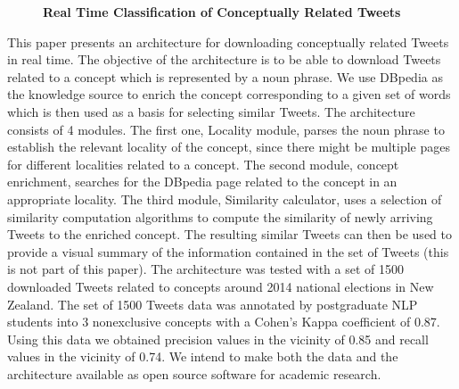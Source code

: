 \documentclass[10pt, a4paper, twopage, headinclude, footinclude, BCOR5mm]{book}
\begin{document}
\newpage

\begin{figure}[t!]
\centering
\large\textbf{Real Time Classification of Conceptually Related Tweets}
\vspace*{0.5cm}
\end{figure}


\begin{table}[t!]
\end{table} 
\noindent
This paper presents an architecture for downloading conceptually related Tweets in real time.  The objective of the architecture is to be able to download Tweets related to a concept which is represented by a noun phrase.  We use DBpedia as the knowledge source to enrich the concept corresponding to a given set of words which is then used as a basis for selecting similar Tweets. The architecture consists of 4 modules.  The first one, Locality module, parses the noun phrase to establish the relevant locality of the concept, since there might be multiple pages for different localities related to a concept.  The second module, concept enrichment, searches for the DBpedia page related to the concept in an appropriate locality.  The third module, Similarity calculator, uses a selection of similarity computation algorithms to compute the similarity of newly arriving Tweets to the enriched concept.  The resulting similar Tweets can then be used to provide a visual summary of the information contained in the set of Tweets (this is not part of this paper). The architecture was tested with a set of 1500 downloaded Tweets related to concepts around 2014 national elections in New Zealand.  The set of 1500 Tweets data was annotated by postgraduate NLP students into 3 nonexclusive concepts with a Cohen’s Kappa coefficient of 0.87.  Using this data we obtained precision values in the vicinity of 0.85 and recall values in the vicinity of 0.74.  We intend to make both the data and the architecture available as open source software for academic research.     
\end{document}
